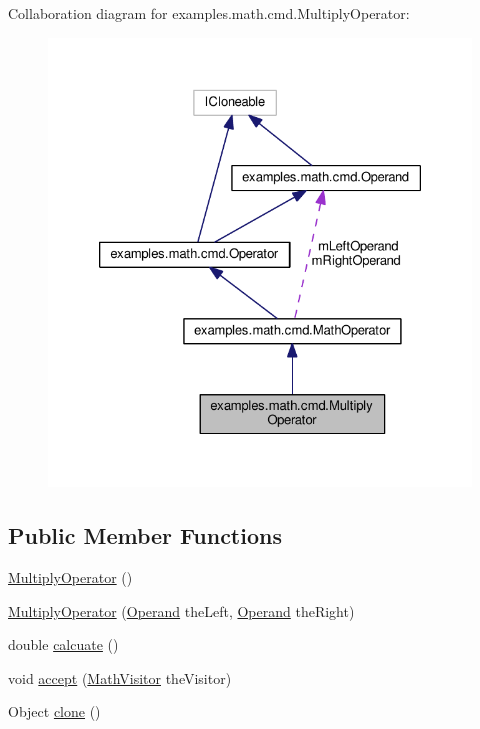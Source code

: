 Collaboration diagram for examples.\-math.\-cmd.\-Multiply\-Operator\-:
\nopagebreak
\begin{figure}[H]
\begin{center}
\leavevmode
\includegraphics[width=326pt]{classexamples_1_1math_1_1cmd_1_1_multiply_operator__coll__graph}
\end{center}
\end{figure}
\subsection*{Public Member Functions}
\begin{DoxyCompactItemize}
\item 
\hyperlink{classexamples_1_1math_1_1cmd_1_1_multiply_operator_a8904244c1fefe06a4fa14fbe80d8927f}{Multiply\-Operator} ()
\item 
\hyperlink{classexamples_1_1math_1_1cmd_1_1_multiply_operator_a757ff01b921315928fd186bb6bb59052}{Multiply\-Operator} (\hyperlink{interfaceexamples_1_1math_1_1cmd_1_1_operand}{Operand} the\-Left, \hyperlink{interfaceexamples_1_1math_1_1cmd_1_1_operand}{Operand} the\-Right)
\item 
double \hyperlink{classexamples_1_1math_1_1cmd_1_1_multiply_operator_a582a725467188609ce540758a9b8950c}{calcuate} ()
\item 
void \hyperlink{classexamples_1_1math_1_1cmd_1_1_multiply_operator_abd37e8bd8fc22eecb193ee66561df7ae}{accept} (\hyperlink{interfaceexamples_1_1math_1_1_math_visitor}{Math\-Visitor} the\-Visitor)
\item 
Object \hyperlink{classexamples_1_1math_1_1cmd_1_1_multiply_operator_acf60435765518a457f79e1db04247e98}{clone} ()
\end{DoxyCompactItemize}
